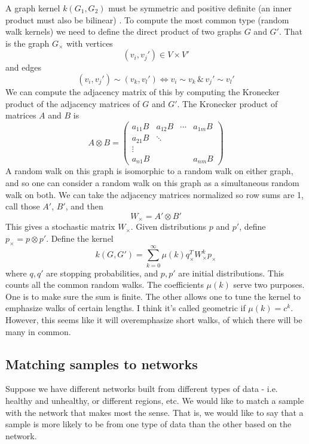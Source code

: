 \documentclass[10pt]{article}
\theoremstyle{definition}
\numberwithin{theorem}{section}
\numberwithin{definition}{section}
\numberwithin{lemma}{section}
\numberwithin{corollary}{section}
\numberwithin{clm}{section}
\numberwithin{rmk}{section}
\begin{document}
A graph kernel $k(G_1,G_2)$ must be symmetric and positive definite (an inner product must also be bilinear) \cite{Vishwanathan}. To compute the most common type (random walk kernels) we need to define the direct product of two graphs $G$ and $G'$. That is the graph $G_{\times}$ with vertices 
\[
(v_i,v_j') \in V \times V'
\]
and edges
\[
(v_i,v_j') \sim (v_k,v_l') \Leftrightarrow v_i \sim v_k \, \&\, v_j' \sim v_l'
\]
We can compute the adjacency matrix of this by computing the Kronecker product of the adjacency matrices of $G$ and $G'$. The Kronecker product of matrices $A$ and $B$ is
\[
A \otimes B = \begin{pmatrix}
a_{11} B & a_{12}B & \cdots & a_{1m}B\\
a_{21}B & \ddots & &\\
\vdots & & & \\
a_{n1}B & & & a_{nm}B
\end{pmatrix}
\]
A random walk on this graph is isomorphic to a random walk on either graph, and so one can consider a random walk on this graph as a simultaneous random walk on both. We can take the adjacency matrices normalized so row sums are 1, call those $A'$, $B'$, and then
\[
W_{\times}  = A' \otimes B'
\] 
This gives a stochastic matrix $W_{\times}$. Given distributions $p$ and $p'$, define $p_{\times}  = p \otimes p'$. Define the kernel
\[
k(G,G') = \sum_{k=0}^{\infty} \mu(k) q_{\times}^T W_{\times}^k p_{\times}
\]
where $q,q'$ are stopping probabilities, and $p,p'$ are initial distributions. This counts all the common random walks. The coefficients $\mu(k)$ serve two purposes. One is to make sure the sum is finite. The other allows one to tune the kernel to emphasize walks of certain lengths. I think it's called geometric if $\mu(k) = c^k$. However, this seems like it will overemphasize short walks, of which there will be many in common.


\subsection{Matching samples to networks}

Suppose we have different networks built from different types of data - i.e. healthy and unhealthy, or different regions, etc. We would like to match a sample with the network that makes most the sense. That is, we would like to say that a sample is more likely to be from one type of data than the other based on the network.
\end{document}
